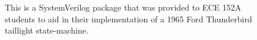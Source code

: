 
\begin{figure}[t]
    \centering
    \small
    \inputminted[frame=single]{systemverilog}{code/ece152a_pkg.sv}
    \caption{This is a SystemVerilog package that was provided to ECE 152A students to aid in their implementation of a 1965 Ford Thunderbird taillight state-machine.}
    \label{fig:ece152a_pkg}
\end{figure}

